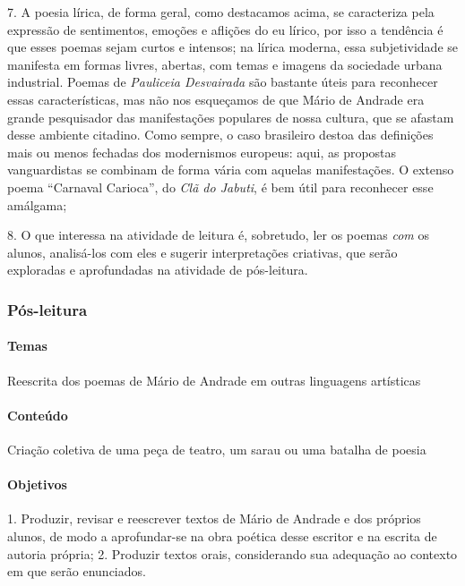 \documentclass[11pt]{extarticle}
\begin{document}
\vspace{3mm}

7. A poesia lírica, de forma geral, como destacamos acima, se
caracteriza pela expressão de sentimentos, emoções e aflições do eu
lírico, por isso a tendência é que esses poemas sejam curtos e intensos;
na lírica moderna, essa subjetividade se manifesta em formas livres,
abertas, com temas e imagens da sociedade urbana industrial. Poemas de
\emph{Pauliceia Desvairada} são bastante úteis para reconhecer essas
características, mas não nos esqueçamos de que Mário de Andrade era
grande pesquisador das manifestações populares de nossa cultura, que se
afastam desse ambiente citadino. Como sempre, o caso brasileiro destoa
das definições mais ou menos fechadas dos modernismos europeus: aqui, as
propostas vanguardistas se combinam de forma vária com aquelas
manifestações. O extenso poema ``Carnaval Carioca'', do \emph{Clã do
Jabuti}, é bem útil para reconhecer esse amálgama;

\vspace{3mm}

8. O que interessa na atividade de leitura é, sobretudo, ler os poemas
\emph{com} os alunos, analisá-los com eles e sugerir interpretações
criativas, que serão exploradas e aprofundadas na atividade de
pós-leitura.

\subsubsection{Pós-leitura}



\paragraph{Temas} Reescrita dos poemas de Mário de Andrade em outras
linguagens artísticas

\paragraph{Conteúdo} Criação coletiva de uma peça de teatro, um sarau ou
uma batalha de poesia

\paragraph{Objetivos} 1. Produzir, revisar e reescrever textos de Mário de
Andrade e dos próprios alunos, de modo a aprofundar-se na obra poética
desse escritor e na escrita de autoria própria; 2. Produzir textos
orais, considerando sua adequação ao contexto em que serão enunciados.
\end{document}
